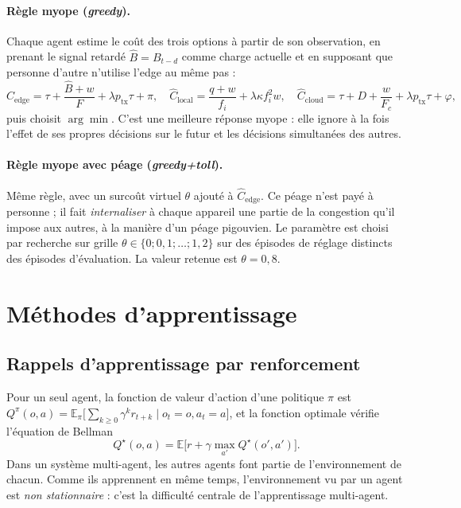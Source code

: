 \documentclass[11pt,a4paper]{article}
\newcommand{\E}{\mathbb{E}}
\begin{document}
\paragraph{Règle myope (\emph{greedy}).} Chaque agent estime le coût des trois options à partir de son
observation, en prenant le signal retardé $\hat B=B_{t-d}$ comme charge actuelle et en supposant que personne
d'autre n'utilise l'edge au même pas :
\[
  \hat C_{\text{edge}} = \tau + \frac{\hat B + w}{F} + \lambda p_{\mathrm{tx}}\tau + \pi,\quad
  \hat C_{\text{local}} = \frac{q+w}{f_i}+\lambda\kappa f_i^2 w,\quad
  \hat C_{\text{cloud}} = \tau + D + \frac{w}{F_c} + \lambda p_{\mathrm{tx}}\tau + \varphi ,
\]
puis choisit $\arg\min$. C'est une meilleure réponse myope : elle ignore à la fois l'effet de ses propres décisions
sur le futur et les décisions simultanées des autres.

\paragraph{Règle myope avec péage (\emph{greedy+toll}).} Même règle, avec un surcoût virtuel $\theta$ ajouté à
$\hat C_{\text{edge}}$. Ce péage n'est payé à personne ; il fait \emph{internaliser} à chaque appareil une partie
de la congestion qu'il impose aux autres, à la manière d'un péage pigouvien. Le paramètre est choisi par
recherche sur grille $\theta\in\{0;0{,}1;\dots;1{,}2\}$ sur des épisodes de réglage distincts des épisodes
d'évaluation. La valeur retenue est $\theta=0{,}8$.

\section{Méthodes d'apprentissage}

\subsection{Rappels d'apprentissage par renforcement}

Pour un seul agent, la fonction de valeur d'action d'une politique $\pi$ est
$Q^\pi(o,a)=\E_\pi\bigl[\sum_{k\ge0}\gamma^k r_{t+k}\mid o_t=o,a_t=a\bigr]$, et la fonction optimale vérifie
l'équation de Bellman
\begin{equation}
  Q^\star(o,a)=\E\bigl[r+\gamma\max_{a'}Q^\star(o',a')\bigr].
\end{equation}
Dans un système multi-agent, les autres agents font partie de l'environnement de chacun. Comme ils apprennent en
même temps, l'environnement vu par un agent est \emph{non stationnaire} : c'est la difficulté centrale de
l'apprentissage multi-agent.
\end{document}
